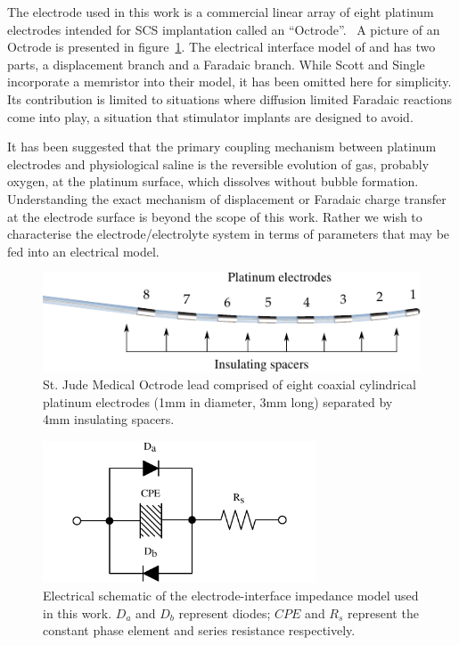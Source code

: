 \documentclass[journal, a4paper]{IEEEtran}
\begin{document}
The electrode used in this work is a commercial linear array of eight platinum electrodes intended for SCS implantation called an ``Octrode''.~\cite{StJudeOctrode} A picture of an Octrode is presented in figure~\ref{fig:octrode}.
The electrical interface model of \cite{Franks2005} and \cite{ScottSingle2013} has two parts, a displacement branch and a Faradaic branch. {\color{blue} While Scott and Single \cite{ScottSingle2013} incorporate a memristor into their model, it has been omitted here for simplicity. Its contribution is limited to situations where diffusion limited Faradaic reactions come into play, a situation that stimulator implants are designed to avoid.}

{\color{blue} It has been suggested that the primary coupling mechanism between platinum electrodes and physiological saline is the reversible evolution of gas, probably oxygen, at the platinum surface, which dissolves without bubble formation.\cite{Greatbatch1969} Understanding the exact mechanism of displacement or Faradaic charge transfer at the electrode surface is beyond the scope of this work. Rather we wish to characterise the electrode/electrolyte system in terms of parameters that may be fed into an electrical model.}

\begin{figure}
    \begin{center}
    \includegraphics{graphics/StJudeOctrodeDiagram}
    \end{center}
    \caption{St. Jude Medical Octrode lead comprised of eight coaxial cylindrical platinum electrodes (1mm in diameter, 3mm long) separated by 4mm insulating spacers.}
    \label{fig:octrode}
\end{figure}

\begin{figure}
    \begin{center}
        \includegraphics[width=230pt]{graphics/interfaceSchematic_noMemristive}
    \end{center}
    \caption{Electrical schematic of the electrode-interface impedance model used in this work. $D_{a}$ and $D_{b}$ represent diodes; $CPE$ and $R_{s}$ represent the constant phase element and series resistance respectively.}
    \label{fig:schematic}
\end{figure}
\end{document}
